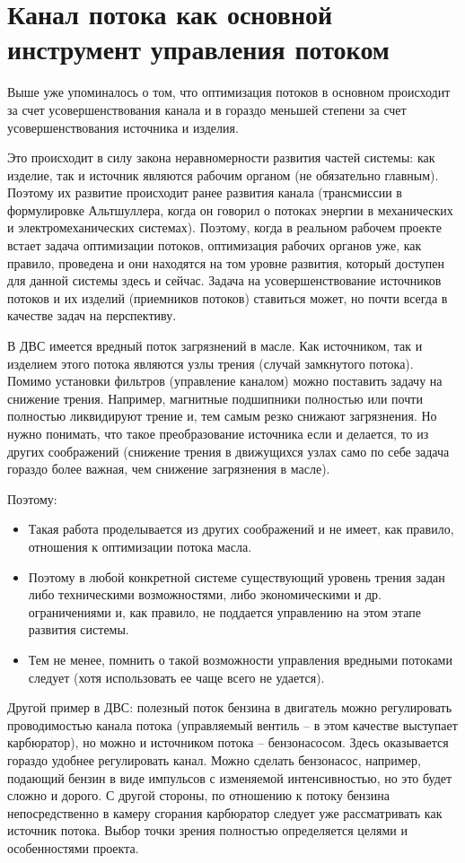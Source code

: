 \documentclass[a4paper,11pt]{article}
\begin{document}
\section{Канал потока как основной инструмент управления потоком}

Выше уже упоминалось о том, что оптимизация потоков в основном происходит за
счет усовершенствования канала и в гораздо меньшей степени за счет
усовершенствования источника и изделия.

Это происходит в силу закона неравномерности развития частей системы: как
изделие, так и источник являются рабочим органом (не обязательно главным).
Поэтому их развитие происходит ранее развития канала (трансмиссии в
формулировке Альтшуллера, когда он говорил о потоках энергии в механических и
электромеханических системах). Поэтому, когда в реальном рабочем проекте
встает задача оптимизации потоков, оптимизация рабочих органов уже, как
правило, проведена и они находятся на том уровне развития, который доступен
для данной системы здесь и сейчас.  Задача на усовершенствование источников
потоков и их изделий (приемников потоков) ставиться может, но почти всегда в
качестве задач на перспективу.

В ДВС имеется вредный поток загрязнений в масле. Как источником, так и
изделием этого потока являются узлы трения (случай замкнутого потока). Помимо
установки фильтров (управление каналом) можно поставить задачу на снижение
трения. Например, магнитные подшипники полностью или почти полностью
ликвидируют трение и, тем самым резко снижают загрязнения. Но нужно понимать,
что такое преобразование источника если и делается, то из других соображений
(снижение трения в движущихся узлах само по себе задача гораздо более важная,
чем снижение загрязнения в масле).

Поэтому:
\begin{itemize}
\item Такая работа проделывается из других соображений и не имеет, как
  правило, отношения к оптимизации потока масла.
\item Поэтому в любой конкретной системе существующий уровень трения задан
  либо техническими возможностями, либо экономическими и др. ограничениями и,
  как правило, не поддается управлению на этом этапе развития системы.
\item Тем не менее, помнить о такой возможности управления вредными потоками
  следует (хотя использовать ее чаще всего не удается).
\end{itemize}

Другой пример в ДВС: полезный поток бензина в двигатель можно регулировать
проводимостью канала потока (управляемый вентиль -- в этом качестве выступает
карбюратор), но можно и источником потока -- бензонасосом. Здесь оказывается
гораздо удобнее регулировать канал. Можно сделать бензонасос, например,
подающий бензин в виде импульсов с изменяемой интенсивностью, но это будет
сложно и дорого. С другой стороны, по отношению к потоку бензина
непосредственно в камеру сгорания карбюратор следует уже рассматривать как
источник потока. Выбор точки зрения полностью определяется целями и
особенностями проекта.
\end{document}
